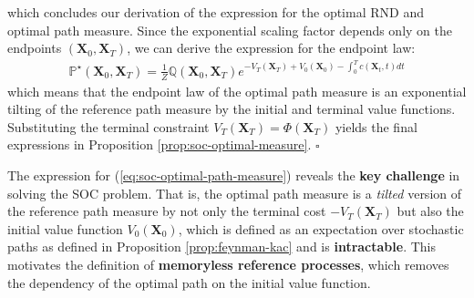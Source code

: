 \documentclass{article}
\newcommand{\boldtext}[1]{\textbf{\textcolor{MyGreen}{#1}}}
\begin{document}
which concludes our derivation of the expression for the optimal RND and optimal path measure. Since the exponential scaling factor depends only on the endpoints $(\boldsymbol{X}_0, \boldsymbol{X}_T)$, we can derive the expression for the endpoint law:  
\begin{align}
    \boxed{\mathbb{P}^\star(\boldsymbol{X}_0, \boldsymbol{X}_T)=\frac{1}{Z}\mathbb{Q}(\boldsymbol{X}_0, \boldsymbol{X}_T)e^{-V_T(\boldsymbol{X}_T)+V_0(\boldsymbol{X}_0)-\int_0^Tc(\boldsymbol{X}_t,t)dt}}
\end{align}
which means that the endpoint law of the optimal path measure is an exponential tilting of the reference path measure by the initial and terminal value functions. Substituting the terminal constraint $V_T(\boldsymbol{X}_T)=\Phi(\boldsymbol{X}_T)$ yields the final expressions in Proposition \ref{prop:soc-optimal-measure}. \hfill $\square$

The expression for (\ref{eq:soc-optimal-path-measure}) reveals the \textbf{key challenge} in solving the SOC problem. That is, the optimal path measure is a \textit{tilted} version of the reference path measure by not only the terminal cost $-V_T(\boldsymbol{X}_T)$ but also the initial value function $V_0(\boldsymbol{X}_0)$, which is defined as an expectation over stochastic paths as defined in Proposition \ref{prop:feynman-kac} and is \textbf{intractable}. This motivates the definition of \boldtext{memoryless reference processes}, which removes the dependency of the optimal path on the initial value function. 
\end{document}
